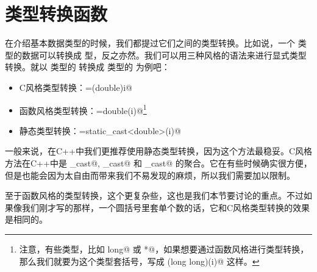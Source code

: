\section{类型转换函数}
在介绍基本数据类型的时候，我们都提过它们之间的类型转换。比如说，一个 \lstinline@int@ 类型的数据可以转换成 \lstinline@double@ 型，反之亦然。我们可以用三种风格的语法来进行显式类型转换。就以 \lstinline@int@ 类型的 \lstinline@i@ 转换成 \lstinline@double@ 类型的 \lstinline@d@ 为例吧：
\begin{itemize}
    \item C风格类型转换：\lstinline@d=(double)i@
    \item 函数风格类型转换：\lstinline@d=double(i)@\footnote{注意，有些类型，比如 \lstinline@long long@ 或 \lstinline@int*@，如果想要通过函数风格进行类型转换，那么我们就要为这个类型套括号，写成 \lstinline@(long long)(i)@ 这样。}
    \item 静态类型转换：\lstinline@d=static_cast<double>(i)@
\end{itemize}\par
一般来说，在C++中我们更推荐使用静态类型转换，因为这个方法最稳妥。C风格方法在C++中是 \lstinline@const_cast@, \lstinline@reinterpret_cast@ 和 \lstinline@static_cast@ 的聚合。它在有些时候确实很方便，但是也能会因为太自由而带来我们不易发现的麻烦，所以我们需要加以限制。\par
至于函数风格的类型转换，这个更复杂些，这也是我们本节要讨论的重点。不过如果像我们刚才写的那样，一个圆括号里套单个数的话，它和C风格类型转换的效果是相同的。\par
